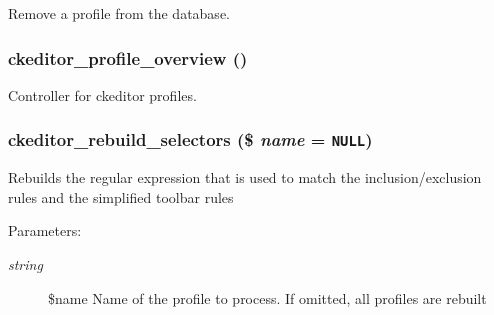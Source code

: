 Remove a profile from the database. \hypertarget{ckeditor_8admin_8inc_1e2b750a7693c88202d5148fb946d1a0}{
\subsubsection[{ckeditor\_\-profile\_\-overview}]{\setlength{\rightskip}{0pt plus 5cm}ckeditor\_\-profile\_\-overview ()}}
\label{ckeditor_8admin_8inc_1e2b750a7693c88202d5148fb946d1a0}


Controller for ckeditor profiles. \hypertarget{ckeditor_8admin_8inc_5a1fea8aefcc4a105619792d09d3c046}{
\subsubsection[{ckeditor\_\-rebuild\_\-selectors}]{\setlength{\rightskip}{0pt plus 5cm}ckeditor\_\-rebuild\_\-selectors (\$ {\em name} = {\tt NULL})}}
\label{ckeditor_8admin_8inc_5a1fea8aefcc4a105619792d09d3c046}


Rebuilds the regular expression that is used to match the inclusion/exclusion rules and the simplified toolbar rules

\begin{Desc}
\item[Parameters:]
\begin{description}
\item[{\em string}]\$name Name of the profile to process. If omitted, all profiles are rebuilt \end{description}
\end{Desc}
